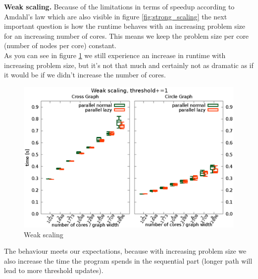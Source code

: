 \documentclass[letterpaper]{article}
\newcommand{\mypar}[1]{{\bf #1.}}
\begin{document}
\mypar{Weak scaling}
Because of the limitations in terms of speedup according to Amdahl's law which are also visible in figure \ref{fig:strong_scaling} the next important question is how the runtime behaves with an increasing problem size for an increasing number of cores. This means we keep the problem size per core (number of nodes per core) constant.\\
As you can see in figure \ref{fig:weak_scaling} we still experience an increase in runtime with increasing problem size, but it's not that much and certainly not as dramatic as if it would be if we didn't increase the number of cores.
\begin{figure}[h]\centering
  \includegraphics[scale=0.558]{weak_scaling.eps}
  \caption{Weak scaling\label{fig:weak_scaling}}
\end{figure}
The behaviour meets our expectations, because with increasing problem size we also increase the time the program spends in the sequential part (longer path will lead to more threshold updates).
\end{document}
